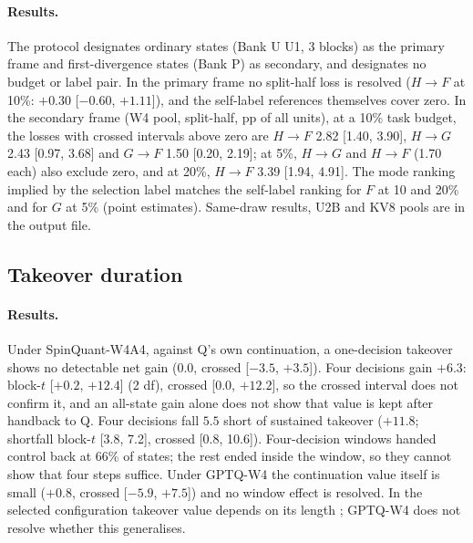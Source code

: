 \paragraph{Results.} The protocol designates ordinary states (Bank U U1, 3 blocks) as the primary frame and first-divergence states (Bank P) as secondary, and designates no budget or label pair. In the primary frame no split-half loss is resolved ($H\!\to\!F$ at 10\%: $+0.30$ [$-0.60$, $+1.11$]), and the self-label references themselves cover zero. In the secondary frame (W4 pool, split-half, pp of all units), at a 10\% task budget, the losses with crossed intervals above zero are $H\!\to\!F$ 2.82 [1.40, 3.90], $H\!\to\!G$ 2.43 [0.97, 3.68] and $G\!\to\!F$ 1.50 [0.20, 2.19]; at 5\%, $H\!\to\!G$ and $H\!\to\!F$ (1.70 each) also exclude zero, and at 20\%, $H\!\to\!F$ 3.39 [1.94, 4.91]. The mode ranking implied by the selection label matches the self-label ranking for $F$ at 10 and 20\% and for $G$ at 5\% (point estimates). Same-draw results, U2B and KV8 pools are in the output file. %

\subsection{Takeover duration}
\label{app:takeover}

\paragraph{Results.} Under SpinQuant-W4A4, against Q's own continuation, a one-decision takeover shows no detectable net gain ($0.0$, crossed [$-3.5$, $+3.5$]). Four decisions gain $+6.3$\pp{}: block-$t$ [$+0.2$, $+12.4$] (2 df), crossed [0.0, $+12.2$], so the crossed interval does not confirm it, and an all-state gain alone does not show that value is kept after handback to Q. Four decisions fall $5.5$\pp{} short of sustained takeover ($+11.8$; shortfall block-$t$ [3.8, 7.2], crossed [0.8, 10.6]). Four-decision windows handed control back at 66\% of states; the rest ended inside the window, so they cannot show that four steps suffice. Under GPTQ-W4 the continuation value itself is small ($+0.8$, crossed [$-5.9$, $+7.5$]) and no window effect is resolved. In the selected configuration takeover value depends on its length \citep[cf.\ handoff costs,][]{ganz2026handoff}; GPTQ-W4 does not resolve whether this generalises. %

